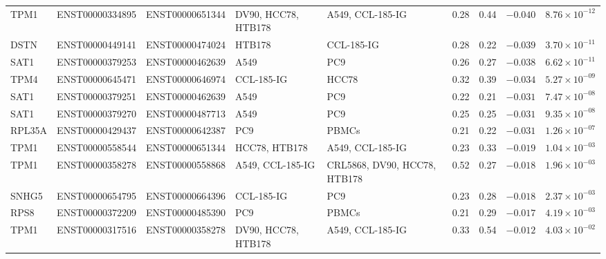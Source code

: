 \begin{landscape}
\begin{longtable}{@{} l l l >{\raggedright\arraybackslash}p{4.6cm} >{\raggedright\arraybackslash}p{4.6cm} r r r r @{}}
TPM1   & ENST00000334895 & ENST00000651344 & DV90, HCC78, HTB178 & A549, CCL-185-IG & 0.28 & 0.44 & $-0.040$ & $8.76 \times 10^{-12}$ \\
DSTN   & ENST00000449141 & ENST00000474024 & HTB178 & CCL-185-IG & 0.28 & 0.22 & $-0.039$ & $3.70 \times 10^{-11}$ \\
SAT1   & ENST00000379253 & ENST00000462639 & A549 & PC9 & 0.26 & 0.27 & $-0.038$ & $6.62 \times 10^{-11}$ \\
TPM4   & ENST00000645471 & ENST00000646974 & CCL-185-IG & HCC78 & 0.32 & 0.39 & $-0.034$ & $5.27 \times 10^{-09}$ \\
SAT1   & ENST00000379251 & ENST00000462639 & A549 & PC9 & 0.22 & 0.21 & $-0.031$ & $7.47 \times 10^{-08}$ \\
SAT1   & ENST00000379270 & ENST00000487713 & A549 & PC9 & 0.25 & 0.25 & $-0.031$ & $9.35 \times 10^{-08}$ \\
RPL35A & ENST00000429437 & ENST00000642387 & PC9 & PBMCs & 0.21 & 0.22 & $-0.031$ & $1.26 \times 10^{-07}$ \\
TPM1   & ENST00000558544 & ENST00000651344 & HCC78, HTB178 & A549, CCL-185-IG & 0.23 & 0.33 & $-0.019$ & $1.04 \times 10^{-03}$ \\
TPM1   & ENST00000358278 & ENST00000558868 & A549, CCL-185-IG & CRL5868, DV90, HCC78, HTB178 & 0.52 & 0.27 & $-0.018$ & $1.96 \times 10^{-03}$ \\
SNHG5  & ENST00000654795 & ENST00000664396 & CCL-185-IG & PC9 & 0.23 & 0.28 & $-0.018$ & $2.37 \times 10^{-03}$ \\
RPS8   & ENST00000372209 & ENST00000485390 & PC9 & PBMCs & 0.21 & 0.29 & $-0.017$ & $4.19 \times 10^{-03}$ \\
TPM1   & ENST00000317516 & ENST00000358278 & DV90, HCC78, HTB178 & A549, CCL-185-IG & 0.33 & 0.54 & $-0.012$ & $4.03 \times 10^{-02}$ \\
\end{longtable}
\endgroup
\end{landscape}


